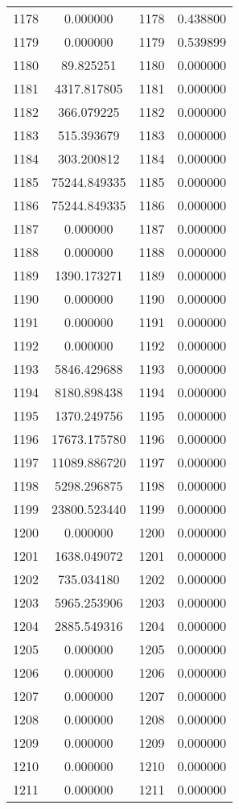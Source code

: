 \documentclass[12pt]{article}
\begin{document}
\begin{longtable}{@{}cccc@{}}
1178 & 0.000000 & 1178 & 0.438800 \\
1179 & 0.000000 & 1179 & 0.539899 \\
1180 & 89.825251 & 1180 & 0.000000 \\
1181 & 4317.817805 & 1181 & 0.000000 \\
1182 & 366.079225 & 1182 & 0.000000 \\
1183 & 515.393679 & 1183 & 0.000000 \\
1184 & 303.200812 & 1184 & 0.000000 \\
1185 & 75244.849335 & 1185 & 0.000000 \\
1186 & 75244.849335 & 1186 & 0.000000 \\
1187 & 0.000000 & 1187 & 0.000000 \\
1188 & 0.000000 & 1188 & 0.000000 \\
1189 & 1390.173271 & 1189 & 0.000000 \\
1190 & 0.000000 & 1190 & 0.000000 \\
1191 & 0.000000 & 1191 & 0.000000 \\
1192 & 0.000000 & 1192 & 0.000000 \\
1193 & 5846.429688 & 1193 & 0.000000 \\
1194 & 8180.898438 & 1194 & 0.000000 \\
1195 & 1370.249756 & 1195 & 0.000000 \\
1196 & 17673.175780 & 1196 & 0.000000 \\
1197 & 11089.886720 & 1197 & 0.000000 \\
1198 & 5298.296875 & 1198 & 0.000000 \\
1199 & 23800.523440 & 1199 & 0.000000 \\
1200 & 0.000000 & 1200 & 0.000000 \\
1201 & 1638.049072 & 1201 & 0.000000 \\
1202 & 735.034180 & 1202 & 0.000000 \\
1203 & 5965.253906 & 1203 & 0.000000 \\
1204 & 2885.549316 & 1204 & 0.000000 \\
1205 & 0.000000 & 1205 & 0.000000 \\
1206 & 0.000000 & 1206 & 0.000000 \\
1207 & 0.000000 & 1207 & 0.000000 \\
1208 & 0.000000 & 1208 & 0.000000 \\
1209 & 0.000000 & 1209 & 0.000000 \\
1210 & 0.000000 & 1210 & 0.000000 \\
1211 & 0.000000 & 1211 & 0.000000 \\

\end{longtable}
\end{document}
